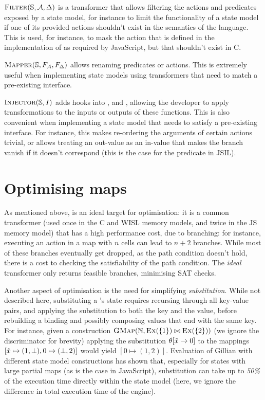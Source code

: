 $\textsc{Filter}(\mathbb S, {\cal{A}}, \Delta)$ is a transformer that allows filtering the actions and predicates exposed by a state model, for instance to limit the functionality of a state model if one of its provided actions shouldn't exist in the semantics of the language. This is used, for instance, to mask the  action that is defined in the implementation of \PMap{} as required by JavaScript, but that shouldn't exist in C.

$\textsc{Mapper}(\mathbb S, F_{\cal{A}}, F_\Delta)$ allows renaming predicates or actions. This is extremely useful when implementing state models using transformers that need to match a pre-existing interface.

$\textsc{Injector}(\mathbb S, I)$ adds hooks into \consume, \produce{} and \execac{}, allowing the developer to apply transformations to the inputs or outputs of these functions. This is also convenient when implementing a state model that needs to satisfy a pre-existing interface. For instance, this makes re-ordering the arguments of certain actions trivial, or allows treating an out-value as an in-value that makes the branch vanish if it doesn't correspond (this is the case for the  predicate in JSIL).

\section{Optimising maps}

As mentioned above, \GMap{} is an ideal target for optimisation: it is a common transformer (used once in the C and WISL memory models, and twice in the JS memory model) that has a high performance cost, due to branching: for instance, executing an action in a map with $n$ cells can lead to $n + 2$ branches. While most of these branches eventually get dropped, as the path condition doesn't hold, there is a cost to checking the satisfiability of the path condition. The \emph{ideal} \GMap{} transformer only returns feasible branches, minimising SAT checks.

Another aspect of optimisation is the need for simplifying \emph{substitution}. While not described here, substituting a \GMap's state requires recursing through all key-value pairs, and applying the substitution to both the key and the value, before rebuilding a binding and possibly composing values that end with the same key. For instance, given a construction $\textsc{GMap}(\mathbb N, \textsc{Ex}(\{1\}) \bowtie \textsc{Ex}(\{2\}))$ (we ignore the discriminator for brevity) applying the substitution $\theta[\hat{x}\rightarrow 0]$ to the mappings $[ \hat{x} \mapsto (1, \bot), 0 \mapsto (\bot, 2)]$ would yield $[0 \mapsto (1,2)]$. Evaluation of Gillian with different state model constructions has shown that, especially for states with large partial maps (as is the case in JavaScript), substitution can take up to \emph{50\%} of the execution time directly within the state model (here, we ignore the difference in total execution time of the engine).

